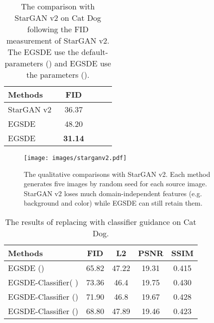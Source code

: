 \documentclass{article}
\begin{document}
\begin{table}[]
\caption{ The comparison with StarGAN v2\cite{choi2020stargan} on Cat  Dog following the FID measurement of StarGAN v2. The EGSDE use the default-parameters () and EGSDE use the parameters (). }
\label{tb : starganv2}
\centering
\vspace{.2cm}
\renewcommand\arraystretch{1.2}
\begin{tabular}{lcccc}
\toprule
 Methods      & FID    \\
\midrule
StarGAN v2~\cite{choi2020stargan}   & 36.37  \\
EGSDE  & 48.20\\
EGSDE  & \textbf{31.14}\\
\bottomrule
\end{tabular}
\end{table}
\begin{figure}
  \centering
  \texttt{[image: images/starganv2.pdf]}
  \caption{The qualitative comparisons with StarGAN v2. Each method generates five images by random seed for each source image. StarGAN v2 loses much domain-independent features (e.g. background and color) while EGSDE can still retain them.}
  \vspace{-0.5cm}
  \label{fig: StarGAN v2}
\end{figure}
\begin{table}[]
\caption{The results of replacing  with classifier guidance on Cat  Dog.}
\label{tb : classifier-guidance}
\centering
\vspace{.2cm}
\renewcommand\arraystretch{1.2}
\begin{tabular}{lcccc}
\toprule
 Methods      & FID    & L2     & PSNR   & SSIM    \\
\midrule
EGSDE () & 65.82  & 47.22  & 19.31  & 0.415 \\
EGSDE-Classifier( ) & 73.36 & 46.4 & 19.75 & 0.430  \\
EGSDE-Classifier ()  & 71.90 & 46.8 & 19.67 & 0.428  \\ 
EGSDE-Classifier ()  & 68.80 & 47.89 & 19.46 & 0.423  \\ 
\bottomrule
\end{tabular}
\end{table}
\end{document}

